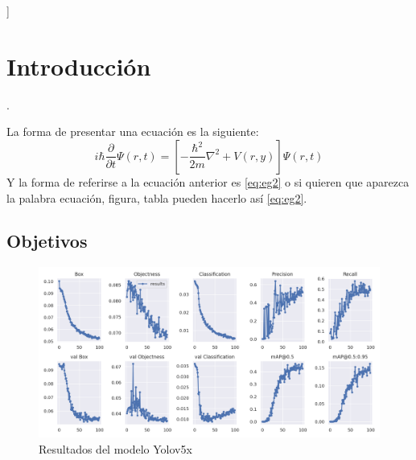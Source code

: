 \documentclass[11pt,letterpaper,twocolumn]{article}
\begin{document}
]

 
\section*{Introducción}
\lipsum[1].\par
La forma de presentar una ecuación es la siguiente: 
\begin{equation}
    \label{eq:eg2}
    i \hbar \frac{\partial}{\partial t} \Psi (r,t)= \left[ -\frac{\hbar^{2}}{2m} \nabla^{2} +V(r,y)\right] \Psi (r,t)
\end{equation}
Y la forma de referirse a la ecuación anterior es \ref{eq:eg2} o si quieren que aparezca la palabra ecuación, figura, tabla pueden hacerlo así \autoref{eq:eg2}. \par 

\subsection*{Objetivos}

\begin{figure}[ht] %
    \centering
    \includegraphics[width=\textwidth]{figuras/results.png} 
    \caption{Resultados del modelo Yolov5x}
    \label{fig:resultados}
\end{figure}
\end{document}
